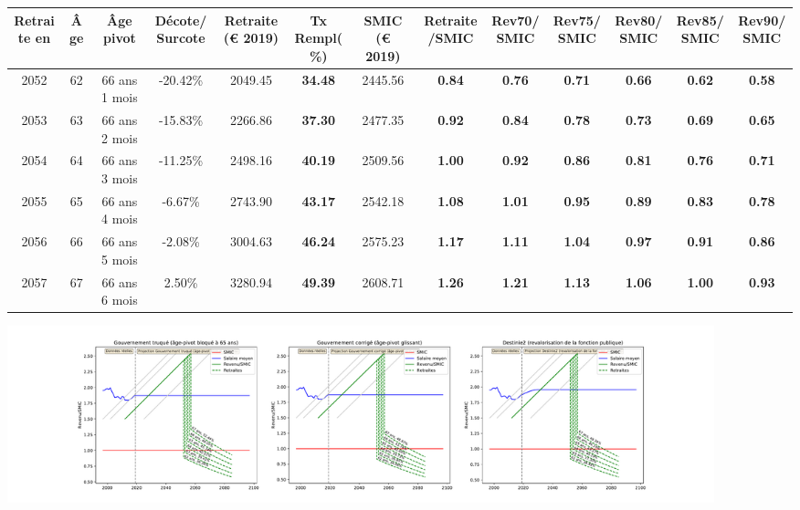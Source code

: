 { \scriptsize \begin{center} 
\begin{tabular}[htb]{|c|c||c|c||c|c||c||c|c|c|c|c|c|} 
\hline 
 Retraite en &  Âge &  Âge pivot &  Décote/Surcote &  Retraite (\euro{} 2019) &  Tx Rempl(\%) &  SMIC (\euro{} 2019) &  Retraite/SMIC &  Rev70/SMIC &  Rev75/SMIC &  Rev80/SMIC &  Rev85/SMIC &  Rev90/SMIC \\ 
\hline \hline 
 2052 &  62 &  66 ans 1 mois &  -20.42\% &  2049.45 &  {\bf 34.48} &  2445.56 &  {\bf {\color{red} 0.84}} &  {\bf {\color{red} 0.76}} &  {\bf {\color{red} 0.71}} &  {\bf {\color{red} 0.66}} &  {\bf {\color{red} 0.62}} &  {\bf {\color{red} 0.58}} \\ 
\hline 
 2053 &  63 &  66 ans 2 mois &  -15.83\% &  2266.86 &  {\bf 37.30} &  2477.35 &  {\bf {\color{red} 0.92}} &  {\bf {\color{red} 0.84}} &  {\bf {\color{red} 0.78}} &  {\bf {\color{red} 0.73}} &  {\bf {\color{red} 0.69}} &  {\bf {\color{red} 0.65}} \\ 
\hline 
 2054 &  64 &  66 ans 3 mois &  -11.25\% &  2498.16 &  {\bf 40.19} &  2509.56 &  {\bf {\color{red} 1.00}} &  {\bf {\color{red} 0.92}} &  {\bf {\color{red} 0.86}} &  {\bf {\color{red} 0.81}} &  {\bf {\color{red} 0.76}} &  {\bf {\color{red} 0.71}} \\ 
\hline 
 2055 &  65 &  66 ans 4 mois &  -6.67\% &  2743.90 &  {\bf 43.17} &  2542.18 &  {\bf 1.08} &  {\bf 1.01} &  {\bf {\color{red} 0.95}} &  {\bf {\color{red} 0.89}} &  {\bf {\color{red} 0.83}} &  {\bf {\color{red} 0.78}} \\ 
\hline 
 2056 &  66 &  66 ans 5 mois &  -2.08\% &  3004.63 &  {\bf 46.24} &  2575.23 &  {\bf 1.17} &  {\bf 1.11} &  {\bf 1.04} &  {\bf {\color{red} 0.97}} &  {\bf {\color{red} 0.91}} &  {\bf {\color{red} 0.86}} \\ 
\hline 
 2057 &  67 &  66 ans 6 mois &  2.50\% &  3280.94 &  {\bf 49.39} &  2608.71 &  {\bf 1.26} &  {\bf 1.21} &  {\bf 1.13} &  {\bf 1.06} &  {\bf {\color{red} 1.00}} &  {\bf {\color{red} 0.93}} \\ 
\hline 
\hline 
\end{tabular} 
\end{center} } 

 \begin{center}\includegraphics[width=0.9\textwidth]{fig/Ascendant1525_1990_22_dest_retraite.pdf}\end{center} \label{fig/Ascendant1525_1990_22_dest_retraite.pdf} 

